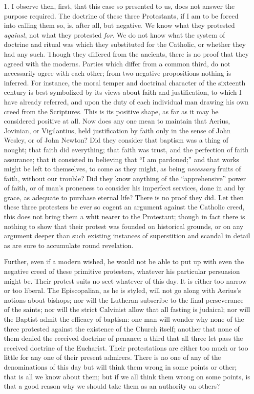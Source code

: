 1. I observe then, first, that this case so presented to us, does
not answer the purpose required. The doctrine of these three
Protestants, if I am to be forced into calling them so, is, after all,
but negative. We know what they protested \emph{against}, not what
they protested \emph{for}. We do not know what the system of doctrine
and ritual was which they substituted for the Catholic, or whether
they had any such. Though they differed from the ancients, there is no
proof that they agreed with the moderns. Parties which differ from a
common third, do not necessarily agree with each other; from two
negative propositions nothing is inferred. For instance, the moral
temper and doctrinal character of the sixteenth century is best
symbolized by its views about faith and justification, to which I have
already referred, and upon the duty of each individual man drawing his
own creed from the Scriptures. This is its positive shape, as far as
it may be considered positive at all. Now does any one mean to
maintain that Aerius, Jovinian, or Vigilantius, held justification by
faith only in the sense of John Wesley, or of John Newton? Did
they consider that baptism was a thing of nought; that faith did
everything; that faith was trust, and the perfection of faith
assurance; that it consisted in believing that ``I am
pardoned;'' and that works might be left to themselves, to come as
they might, as being \emph{necessary} fruits of faith, without our
trouble? Did they know anything of the ``apprehensive'' power
of faith, or of man's proneness to consider his imperfect services,
done in and by grace, as adequate to purchase eternal life? There is
no proof they did. Let then these three protesters be ever so cogent
an argument against the Catholic creed, this does not bring them a
whit nearer to the Protestant; though in fact there is nothing to show
that their protest was founded on historical grounds, or on any
argument deeper than such existing instances of superstition and
scandal in detail as are sure to accumulate round revelation.

Further, even if a modern wished, he would not be able to put up
with even the negative creed of these primitive protesters, whatever
his particular persuasion might be. Their protest suits no sect
whatever of this day. It is either too narrow or too liberal. The
Episcopalian, as he is styled, will not go along with Aerius's notions
about bishops; nor will the Lutheran subscribe to the final
perseverance of the saints; nor will the strict Calvinist allow that
all fasting is judaical; nor will the Baptist admit the efficacy of
baptism: one man will wonder why none of the three protested against
the existence of the Church itself; another that none of them denied
the received doctrine of penance; a third that all three let pass the
received doctrine of the Eucharist. Their protestations are either too
much or too little for any one of their present admirers. There is no
one of any of the denominations of this day but will think them
wrong in some points or other; that is all we know about them; but if
we all think them wrong on some points, is that a good reason why we
should take them as an authority on others?

